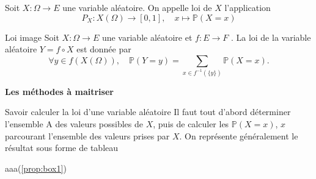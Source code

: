 \documentclass[10pt,a4paper]{report}
\begin{document}
\begin{definition}{}{}
  Soit $X : \Omega \longrightarrow E$ une variable aléatoire. On appelle loi de $X$ l'application
    \[ P_{X} : X\left( \Omega \right)\to  [0,1],\quad x\mapsto \mathbb{P}\left( X=x\right)\]
\end{definition}

\begin{proposition}{Loi image}{}
 Soit $X : \Omega \longrightarrow E$  une variable aléatoire et $f : E \longrightarrow F$ . La loi de la variable aléatoire $Y=f\circ  X$
est donnée par
\[\forall y \in f\left(X\left(\Omega \right) \right),\quad \mathbb{P}\left(Y=y\right)=\sum_{x\in f^{-1}\left(\{y\} \right)}\mathbb{P}\left(X=x \right).  \]
\end{proposition}

\begin{Box4}{}
\begin{center}
{\Huge\textbf{Les méthodes à maitriser}}
\end{center}
\end{Box4}

\setcounter{chapter}{26}

\begin{method}[colbacktitle={yellow}]{Savoir calculer la loi d'une variable aléatoire}{}\label{prop:box1}
Il faut tout d'abord déterminer l'ensemble A des valeurs possibles de $X$, puis de calculer les
$\mathbb{P}\left(X=x\right)$, $x$ parcourant l'ensemble des valeurs prises par $X$. On représente généralement le résultat sous forme de tableau
\end{method}
aaa(\ref{prop:box1})
\end{document}
